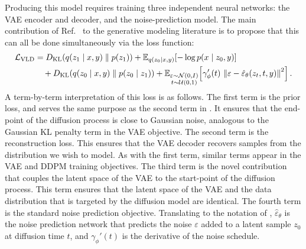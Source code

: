 Producing this model requires training three independent neural networks: the VAE encoder and decoder, and the noise-prediction model.
The main contribution of Ref.~\cite{Shmakov:2023kjj} to the generative modeling literature is to propose that this can all be done simultaneously via the loss function:
\begin{align}
    \mathcal{L}_{\text{VLD}}
    &= D_\text{KL}\!\left(q(z_1 \mid x, y) \;\|\; p(z_1)\right)
     + \mathbb{E}_{q(z_0 \mid x, y)}\!\left[-\log p(x \mid z_0, y)\right] \notag \\
    &\quad + D_\text{KL}\!\left(q(z_0 \mid x, y) \;\|\; p(z_0 \mid z_1)\right)
     + \mathbb{E}_{\substack{\varepsilon \sim \mathcal{N}(0, I) \\ t \sim \mathcal{U}(0,1)}}
       \!\left[\gamma_\phi'(t)\, \left\|\varepsilon - \hat{\varepsilon}_\theta(z_t, t, y)\right\|^2\right].
    \label{eq:loss_lvd}
\end{align}
A term-by-term interpretation of this loss is as follows.
The first term is the prior loss, and serves the same purpose as the second term in .
It ensures that the end-point of the diffusion process is close to Gaussian noise, analogous to the Gaussian KL penalty term in the VAE objective.
The second term is the reconstruction loss.
This ensures that the VAE decoder recovers samples from the distribution we wish to model.
As with the first term, similar terms appear in the VAE and DDPM training objectives.
The third term is the novel contribution that couples the latent space of the VAE to the start-point of the diffusion process.
This term ensures that the latent space of the VAE and the data distribution that is targeted by the diffusion model are identical.
The fourth term is the standard noise prediction objective.
Translating to the notation of , $\hat{\varepsilon}_\theta$ is the noise prediction network that predicts the noise $\varepsilon$ added to a latent sample $z_0$ at diffusion time $t$, and $\gamma_\phi'(t)$ is the derivative of the noise schedule.

